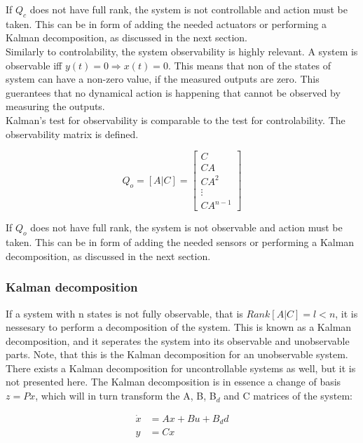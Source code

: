 If $Q_c$ does not have full rank, the system is not controllable and action must be taken. This can be in form of adding the needed actuators or performing a Kalman decomposition, as discussed in the next section.\\

Similarly to controlability, the system observability is highly relevant. A system is observable iff $y(t)=0 \Rightarrow x(t)=0$. This means that non of the states of system can have a non-zero value, if the measured outputs are zero. This guerantees that no dynamical action is happening that cannot be observed by measuring the outputs.\\

Kalman's test for observability is comparable to the test for controlability. The observability matrix is defined.

\begin{equation} 
	Q_o = [A|C] = \begin{bmatrix}
		C \\ CA \\ CA^2 \\ \vdots \\ CA^{n-1}
	\end{bmatrix}
\end{equation}

If $Q_o$ does not have full rank, the system is not observable and action must be taken. This can be in form of adding the needed sensors or performing a Kalman decomposition, as discussed in the next section.\\


\subsubsection{Kalman decomposition}
If a system with n states is not fully observable, that is $Rank[A|C] = l < n$, it is nessesary to perform a decomposition of the system. This is known as a Kalman decomposition, and it seperates the system into its observable and unobservable parts. Note, that this is the Kalman decomposition for an unobservable system. There exists a Kalman decomposition for uncontrollable systems as well, but it is not presented here. The Kalman decomposition is in essence a change of basis $z=Px$, which will in turn transform the A, B, B$_d$ and C matrices of the system:


\begin{equation} 
	\begin{split}
		\dot{x} & = Ax + Bu + B_dd \\
		y & = Cx
	\end{split}
\end{equation}

